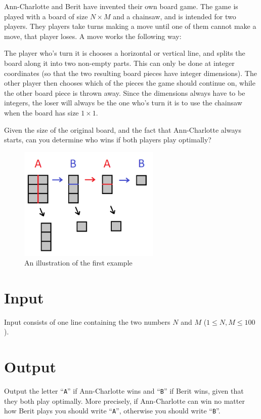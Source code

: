 Ann-Charlotte and Berit have invented their own board game.
The game is played with a board of size $N \times M$ and a chainsaw, and is intended for two players.
They players take turns making a move until one of them cannot make a move, that player loses.
A move works the following way:

The player who's turn it is chooses a horizontal or vertical line, and splits the board along it into two non-empty parts.
This can only be done at integer coordinates (so that the two resulting board pieces have integer dimensions).
The other player then chooses which of the pieces the game should continue on, while the other board piece is thrown away.
Since the dimensions always have to be integers, the loser will always be the one who's turn it is to use the chainsaw when the board has size $1 \times 1$.

Given the size of the original board, and the fact that Ann-Charlotte always starts, can you determine who wins if both players play optimally?

\begin{figure}[ht!]
\centering
\includegraphics[width=0.6\textwidth]{bradspelet.png}
\caption{An illustration of the first example}
\label{overflow}
\end{figure}

\section*{Input}
Input consists of one line containing the two numbers $N$ and $M$ ($1 \le N,M \le 100$).

\section*{Output}
Output the letter ``\texttt{A}'' if Ann-Charlotte wins and ``\texttt{B}'' if
Berit wins, given that they both play optimally. More precisely, if Ann-Charlotte
can win no matter how Berit plays you should write ``\texttt{A}'', otherwise you
should write ``\texttt{B}''.

